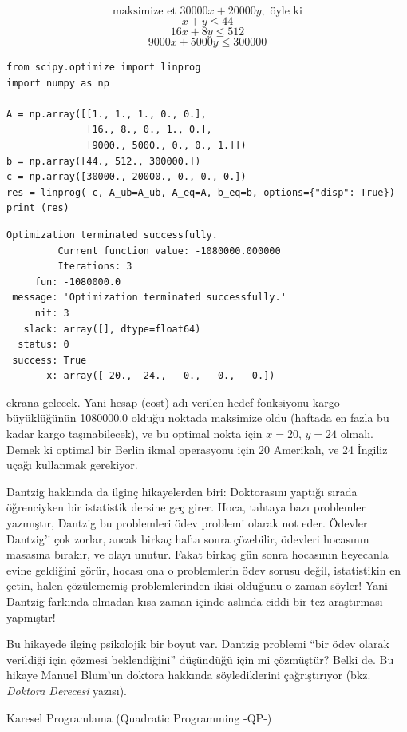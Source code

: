 \documentclass[12pt,fleqn]{article}\usepackage{../../common}
\begin{document}
$$ \textrm{maksimize et  } 30000x + 20000y, \textrm{ öyle ki} $$ 
$$ x + y \le 44 $$
$$ 16x + 8y \le 512 $$
$$  9000x + 5000y \le 300000 $$ 

\begin{verbatim}
from scipy.optimize import linprog
import numpy as np

A = np.array([[1., 1., 1., 0., 0.],
              [16., 8., 0., 1., 0.],
              [9000., 5000., 0., 0., 1.]])
b = np.array([44., 512., 300000.])
c = np.array([30000., 20000., 0., 0., 0.])
res = linprog(-c, A_ub=A_ub, A_eq=A, b_eq=b, options={"disp": True})
print (res)
\end{verbatim}

\begin{verbatim}
Optimization terminated successfully.
         Current function value: -1080000.000000
         Iterations: 3
     fun: -1080000.0
 message: 'Optimization terminated successfully.'
     nit: 3
   slack: array([], dtype=float64)
  status: 0
 success: True
       x: array([ 20.,  24.,   0.,   0.,   0.])
\end{verbatim}

ekrana gelecek. Yani hesap (cost) adı verilen hedef fonksiyonu kargo
büyüklüğünün 1080000.0 olduğu noktada maksimize oldu (haftada en fazla bu kadar
kargo taşınabilecek), ve bu optimal nokta için $x=20$, $y=24$ olmalı. Demek ki
optimal bir Berlin ikmal operasyonu için 20 Amerikalı, ve 24 İngiliz uçağı
kullanmak gerekiyor.

Dantzig hakkında da ilginç hikayelerden biri: Doktorasını yaptığı sırada
öğrenciyken bir istatistik dersine geç girer. Hoca, tahtaya bazı problemler
yazmıştır, Dantzig bu problemleri ödev problemi olarak not eder. Ödevler
Dantzig'i çok zorlar, ancak birkaç hafta sonra çözebilir, ödevleri hocasının
masasına bırakır, ve olayı unutur. Fakat birkaç gün sonra hocasının heyecanla
evine geldiğini görür, hocası ona o problemlerin ödev sorusu değil, istatistikin
en çetin, halen çözülememiş problemlerinden ikisi olduğunu o zaman söyler! Yani
Dantzig farkında olmadan kısa zaman içinde aslında ciddi bir tez araştırması
yapmıştır!

Bu hikayede ilginç psikolojik bir boyut var. Dantzig problemi ``bir ödev olarak
verildiği için çözmesi beklendiğini'' düşündüğü için mi çözmüştür?  Belki de. Bu
hikaye Manuel Blum'un doktora hakkında söylediklerini çağrıştırıyor (bkz. {\em
 Doktora Derecesi} yazısı).

\newpage

Karesel Programlama (Quadratic Programming -QP-)
\end{document}
